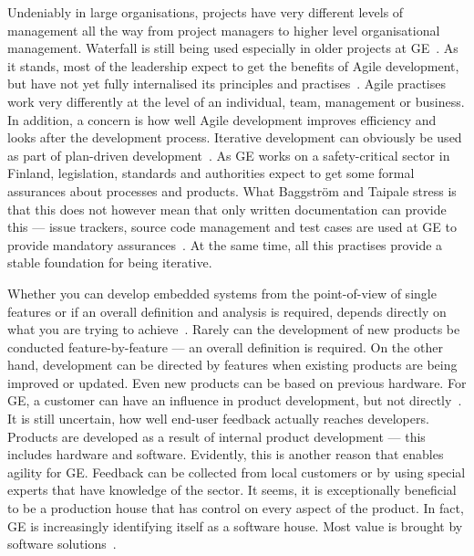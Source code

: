 \documentclass[english]{tktltiki2}
\begin{document}
Undeniably in large organisations, projects have very different levels of management all the way from project managers to higher level organisational management. Waterfall is still being used especially in older projects at GE~\cite{BT15}. As it stands, most of the leadership expect to get the benefits of Agile development, but have not yet fully internalised its principles and practises~\cite{BT15}. Agile practises work very differently at the level of an individual, team, management or business. In addition, a concern is how well Agile development improves efficiency and looks after the development process. Iterative development can obviously be used as part of plan-driven development~\cite{BT15, Hol15b}. As GE works on a safety-critical sector in Finland, legislation, standards and authorities expect to get some formal assurances about processes and products. What Baggström and Taipale stress is that this does not however mean that only written documentation can provide this — issue trackers, source code management and test cases are used at GE to provide mandatory assurances~\cite{BT15}. At the same time, all this practises provide a stable foundation for being iterative.

Whether you can develop embedded systems from the point-of-view of single features or if an overall definition and analysis is required, depends directly on what you are trying to achieve~\cite{BT15}. Rarely can the development of new products be conducted feature-by-feature — an overall definition is required. On the other hand, development can be directed by features when existing products are being improved or updated. Even new products can be based on previous hardware. For GE, a customer can have an influence in product development, but not directly~\cite{BT15}. It is still uncertain, how well end-user feedback actually reaches developers. Products are developed as a result of internal product development — this includes hardware and software. Evidently, this is another reason that enables agility for GE. Feedback can be collected from local customers or by using special experts that have knowledge of the sector. It seems, it is exceptionally beneficial to be a production house that has control on every aspect of the product. In fact, GE is increasingly identifying itself as a software house. Most value is brought by software solutions~\cite{BT15}.
\end{document}
